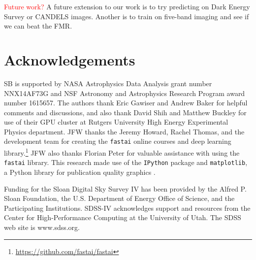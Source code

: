 \documentclass[fleqn,usenatbib]{mnras}
\newcommand{\editorial}[1]{\textcolor{red}{#1}}
\begin{document}
\editorial{Future work?}
A future extension to our work is to try predicting on Dark Energy Survey or CANDELS images.
Another is to train on five-band imaging and see if we can beat the FMR.


\section*{Acknowledgements}

SB is supported by NASA Astrophysics Data Analysis grant number NNX14AF73G and NSF Astronomy and Astrophysics Research Program award number 1615657.
The authors thank Eric Gawiser and Andrew Baker for helpful comments and discussions, and also thank David Shih and Matthew Buckley for use of their GPU cluster at Rutgers University High Energy Experimental Physics department. %
JFW thanks the Jeremy Howard, Rachel Thomas, and the development team for creating the \texttt{fastai} online courses and deep learning library.\footnote{\url{https://github.com/fastai/fastai}}
JFW also thanks Florian Peter for valuable assistance with using the \texttt{fastai} library.
This research made use of the {\tt IPython} package \citep{Perez2007} and {\tt matplotlib}, a Python library for publication quality graphics \citep{Hunter2007}. %

Funding for the Sloan Digital Sky Survey IV has been provided by the Alfred P. Sloan Foundation, the U.S. Department of Energy Office of Science, and the Participating Institutions. SDSS-IV acknowledges
support and resources from the Center for High-Performance Computing at
the University of Utah. The SDSS web site is www.sdss.org.
\end{document}
